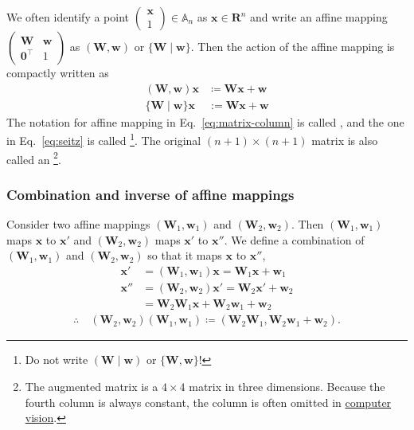 We often identify a point $ \begin{pmatrix} \bm{x} \\ 1 \end{pmatrix} \in \mathbb{A}_{n}$ as $\bm{x} \in \mathbf{R}^{n}$ and write an affine mapping $\begin{pmatrix} \bm{W} & \bm{w} \\ \bm{0}^{\top} & 1 \end{pmatrix}$ as $( \bm{W}, \bm{w})$ or $\{ \bm{W} \mid \bm{w} \}$.
Then the action of the affine mapping is compactly written as
\begin{align}
  \label{eq:matrix-column}
  (\bm{W}, \bm{w}) \bm{x} &\coloneqq \bm{Wx} + \bm{w} \\
  \label{eq:seitz}
  \{ \bm{W} \mid \bm{w} \} \bm{x} &:= \bm{Wx} + \bm{w}
\end{align}
The notation for affine mapping in Eq.~\eqref{eq:matrix-column} is called , and the one in Eq.~\eqref{eq:seitz} is called \footnote{
    Do not write $( \bm{W} \mid \bm{w})$ or $\{ \bm{W}, \bm{w} \}$!
}.
The original $(n  + 1) \times (n + 1)$ matrix is also called an \footnote{
    The augmented matrix is a $4 \times 4$ matrix in three dimensions.
    Because the fourth column is always constant, the column is often omitted in \href{http://opencv.jp/opencv-2.1_org/py/camera_calibration_and_3d_reconstruction.html}{computer vision}.
}.

\subsubsection{\label{sec:affine_mapping_operation}Combination and inverse of affine mappings}

Consider two affine mappings $(\bm{W}_{1}, \bm{w}_{1})$ and $(\bm{W}_{2}, \bm{w}_{2})$.
Then $(\bm{W}_{1}, \bm{w}_{1})$ maps $\bm{x}$ to $\bm{x}'$ and $(\bm{W}_{2}, \bm{w}_{2})$ maps $\bm{x}'$ to $\bm{x}''$.
We define a combination of $(\bm{W}_{1}, \bm{w}_{1})$ and $(\bm{W}_{2}, \bm{w}_{2})$ so that it maps $\bm{x}$ to $\bm{x}''$,
\begin{align*}
    \bm{x}' &= (\bm{W}_{1}, \bm{w}_{1}) \bm{x} = \bm{W}_{1} \bm{x} + \bm{w}_{1} \\
    \bm{x}''
        &= (\bm{W}_{2}, \bm{w}_{2}) \bm{x}' = \bm{W}_{2} \bm{x}' + \bm{w}_{2} \\
        &= \bm{W}_{2} \bm{W}_{1} \bm{x} + \bm{W}_{2} \bm{w}_{1} + \bm{w}_{2}
\end{align*}
\begin{align}
    \therefore \quad
        (\bm{W}_{2}, \bm{w}_{2}) (\bm{W}_{1}, \bm{w}_{1}) \coloneqq (\bm{W}_{2} \bm{W}_{1}, \bm{W}_{2} \bm{w}_{1} + \bm{w}_{2}).
\end{align}

